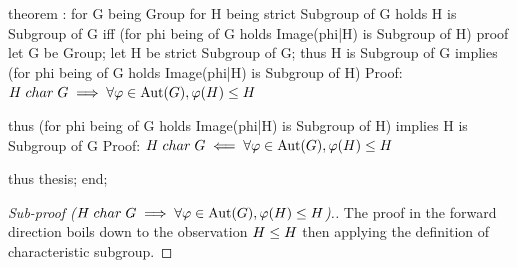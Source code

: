 \nwenddocs{}\endmoddef\nwstartdeflinemarkup{}\nwenddeflinemarkup
theorem :
  for G being Group
  for H being strict Subgroup of G
  holds H is  Subgroup of G iff
  (for phi being  of G holds Image(phi|H) is Subgroup of H)
proof
  let G be Group;
  let H be strict Subgroup of G;
  thus H is  Subgroup of G implies
       (for phi being  of G holds Image(phi|H) is Subgroup of H)
  \LA{}Proof: $H\mathrel{char} G\implies\forall\varphi\in\operatorname{Aut}(G),\varphi(H)\leq H$~{\nwtagstyle{}}\RA{}

  thus (for phi being  of G holds Image(phi|H) is Subgroup of H)
       implies H is  Subgroup of G
  \LA{}Proof: $H\mathrel{char} G\impliedby\forall\varphi\in\operatorname{Aut}(G),\varphi(H)\leq H$~{\nwtagstyle{}}\RA{}

  thus thesis;
end;
\eatline
{}\nwendcode{}\nwdocspar
\begin{proof}[Sub-proof ($H\mathrel{char} G\implies\forall\varphi\in\operatorname{Aut}(G),\varphi(H)\leq H$).]
The proof in the forward direction boils down to the observation
$H\leq H$ then applying the definition of characteristic subgroup.
\end{proof}


